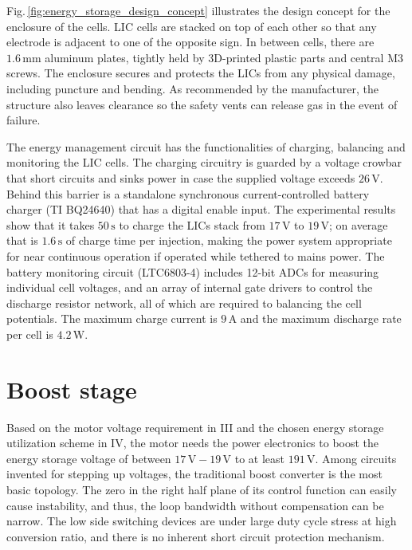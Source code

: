     
    
    Fig.\,\ref{fig:energy_storage_design_concept} illustrates the design concept for the enclosure of the cells. LIC cells are stacked on top of each other so that any electrode is adjacent to one of the opposite sign. In between cells, there are $1.6\,\mathrm{mm}$ aluminum plates, tightly held by 3D-printed plastic parts and central M3 screws. The enclosure secures and protects the LICs from any physical damage, including puncture and bending. As recommended by the manufacturer, the structure also leaves clearance so the safety vents can release gas in the event of failure.
    
    The energy management circuit has the functionalities of charging, balancing and monitoring the LIC cells. The charging circuitry is guarded by a voltage crowbar that short circuits and sinks power in case the supplied voltage exceeds $26\,\mathrm{V}$. Behind this barrier is a standalone synchronous current-controlled battery charger (TI BQ24640) that has a digital enable input. The experimental results show that it takes $50\,\mathrm{s}$ to charge the LICs stack from $17\,\mathrm{V}$ to $19\,\mathrm{V}$; on average that is $1.6\,\mathrm{s}$ of charge time per injection, making the power system appropriate for near continuous operation if operated while tethered to mains power. The battery monitoring circuit (LTC6803-4) includes 12-bit ADCs for measuring individual cell voltages, and an array of internal gate drivers to control the discharge resistor network, all of which are required to balancing the cell potentials. The maximum charge current is $9\,\mathrm{A}$ and the maximum discharge rate per cell is $4.2\,\mathrm{W}$.
    

\section{Boost stage}

    Based on the motor voltage requirement in III and the chosen energy storage utilization scheme in IV, the motor needs the power electronics to boost the energy storage voltage of between $17\,\mathrm{V}-19\,\mathrm{V}$ to at least $191\,\mathrm{V}$. Among circuits invented for stepping up voltages, the traditional boost converter is the most basic topology. The zero in the right half plane of its control function can easily cause instability, and thus, the loop bandwidth without compensation can be narrow. The low side switching devices are under large duty cycle stress at high conversion ratio, and there is no inherent short circuit protection mechanism. 
    
